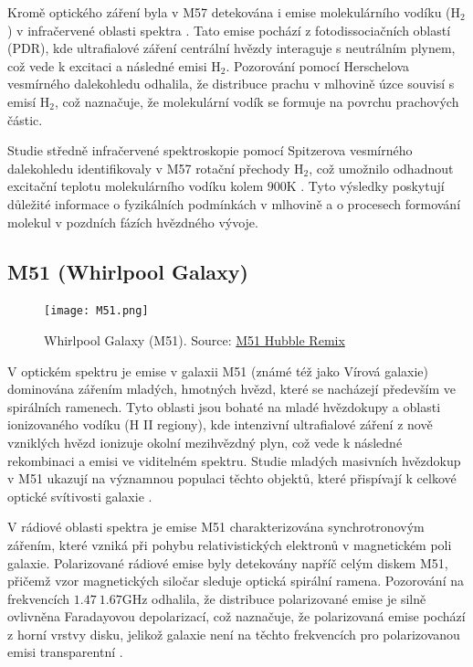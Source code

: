 \documentclass[a4paper,11pt,twocolumn]{article}
\begin{document}
            Kromě optického záření byla v M57 detekována i emise molekulárního vodíku ($\text{H}_\text{2}$) v infračervené oblasti spektra \citet{hoof2010}. Tato emise pochází z fotodissociačních oblastí (PDR), kde ultrafialové záření centrální hvězdy interaguje s neutrálním plynem, což vede k excitaci a následné emisi $\text{H}_\text{2}$. Pozorování pomocí Herschelova vesmírného dalekohledu odhalila, že distribuce prachu v mlhovině úzce souvisí s emisí $\text{H}_\text{2}$, což naznačuje, že molekulární vodík se formuje na povrchu prachových částic. 
            
            Studie středně infračervené spektroskopie pomocí Spitzerova vesmírného dalekohledu identifikovaly v M57 rotační přechody $\text{H}_\text{2}$, což umožnilo odhadnout excitační teplotu molekulárního vodíku kolem $900 \text{K}$ \citet{mata2016}. Tyto výsledky poskytují důležité informace o fyzikálních podmínkách v mlhovině a o procesech formování molekul v pozdních fázích hvězdného vývoje. 

        \subsection{M51 (Whirlpool Galaxy)}
            \begin{figure}
                \centering
                \texttt{[image: M51.png]}
                \caption{Whirlpool Galaxy (M51). Source: \href{https://science.nasa.gov/missions/hubble/m51-hubble-remix/}{M51 Hubble Remix
                }}
                \label{fig:m51}
            \end{figure}

            V optickém spektru je emise v galaxii M51 (známé též jako Vírová galaxie) dominována zářením mladých, hmotných hvězd, které se nacházejí především ve spirálních ramenech. Tyto oblasti jsou bohaté na mladé hvězdokupy a oblasti ionizovaného vodíku (H II regiony), kde intenzivní ultrafialové záření z nově vzniklých hvězd ionizuje okolní mezihvězdný plyn, což vede k následné rekombinaci a emisi ve viditelném spektru. Studie mladých masivních hvězdokup v M51 ukazují na významnou populaci těchto objektů, které přispívají k celkové optické svítivosti galaxie \citet{larsen2000}.

            V rádiové oblasti spektra je emise M51 charakterizována synchrotronovým zářením, které vzniká při pohybu relativistických elektronů v magnetickém poli galaxie. Polarizované rádiové emise byly detekovány napříč celým diskem M51, přičemž vzor magnetických siločar sleduje optická spirální ramena. Pozorování na frekvencích $1.47 ~ 1.67 \text{GHz}$ odhalila, že distribuce polarizované emise je silně ovlivněna Faradayovou depolarizací, což naznačuje, že polarizovaná emise pochází z horní vrstvy disku, jelikož galaxie není na těchto frekvencích pro polarizovanou emisi transparentní \citet{mulcahy2014}.
\end{document}
